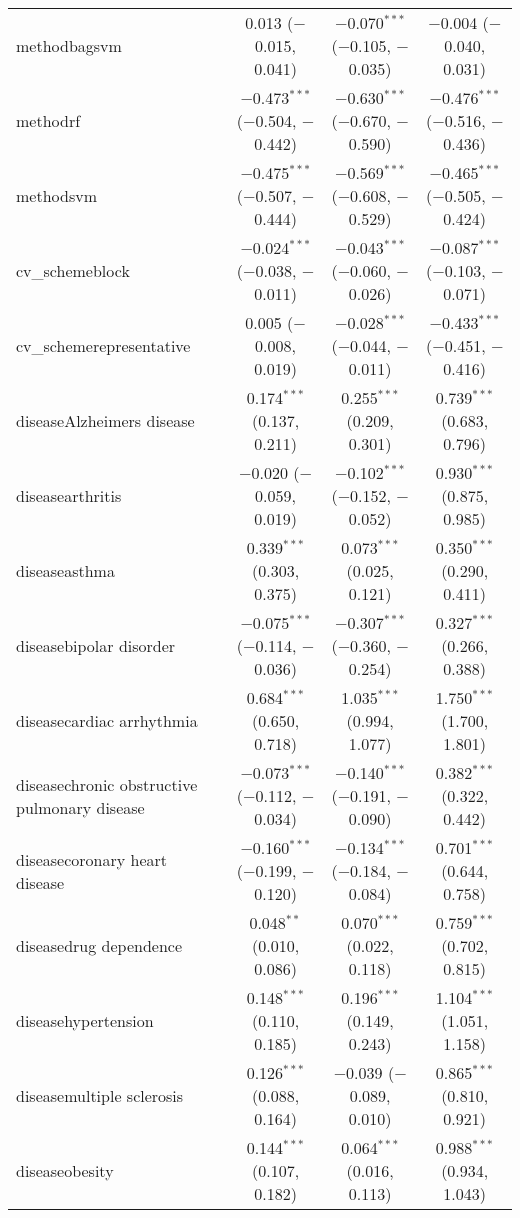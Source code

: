 \begin{table}[!htbp]
\begin{tabular}{@{\extracolsep{5pt}}lccc}
  methodbagsvm & 0.013 ($-$0.015, 0.041) & $-$0.070$^{***}$ ($-$0.105, $-$0.035) & $-$0.004 ($-$0.040, 0.031) \\ 
  methodrf & $-$0.473$^{***}$ ($-$0.504, $-$0.442) & $-$0.630$^{***}$ ($-$0.670, $-$0.590) & $-$0.476$^{***}$ ($-$0.516, $-$0.436) \\ 
  methodsvm & $-$0.475$^{***}$ ($-$0.507, $-$0.444) & $-$0.569$^{***}$ ($-$0.608, $-$0.529) & $-$0.465$^{***}$ ($-$0.505, $-$0.424) \\ 
  cv\_schemeblock & $-$0.024$^{***}$ ($-$0.038, $-$0.011) & $-$0.043$^{***}$ ($-$0.060, $-$0.026) & $-$0.087$^{***}$ ($-$0.103, $-$0.071) \\ 
  cv\_schemerepresentative & 0.005 ($-$0.008, 0.019) & $-$0.028$^{***}$ ($-$0.044, $-$0.011) & $-$0.433$^{***}$ ($-$0.451, $-$0.416) \\ 
  diseaseAlzheimers disease & 0.174$^{***}$ (0.137, 0.211) & 0.255$^{***}$ (0.209, 0.301) & 0.739$^{***}$ (0.683, 0.796) \\ 
  diseasearthritis & $-$0.020 ($-$0.059, 0.019) & $-$0.102$^{***}$ ($-$0.152, $-$0.052) & 0.930$^{***}$ (0.875, 0.985) \\ 
  diseaseasthma & 0.339$^{***}$ (0.303, 0.375) & 0.073$^{***}$ (0.025, 0.121) & 0.350$^{***}$ (0.290, 0.411) \\ 
  diseasebipolar disorder & $-$0.075$^{***}$ ($-$0.114, $-$0.036) & $-$0.307$^{***}$ ($-$0.360, $-$0.254) & 0.327$^{***}$ (0.266, 0.388) \\ 
  diseasecardiac arrhythmia & 0.684$^{***}$ (0.650, 0.718) & 1.035$^{***}$ (0.994, 1.077) & 1.750$^{***}$ (1.700, 1.801) \\ 
  diseasechronic obstructive pulmonary disease & $-$0.073$^{***}$ ($-$0.112, $-$0.034) & $-$0.140$^{***}$ ($-$0.191, $-$0.090) & 0.382$^{***}$ (0.322, 0.442) \\ 
  diseasecoronary heart disease & $-$0.160$^{***}$ ($-$0.199, $-$0.120) & $-$0.134$^{***}$ ($-$0.184, $-$0.084) & 0.701$^{***}$ (0.644, 0.758) \\ 
  diseasedrug dependence & 0.048$^{**}$ (0.010, 0.086) & 0.070$^{***}$ (0.022, 0.118) & 0.759$^{***}$ (0.702, 0.815) \\ 
  diseasehypertension & 0.148$^{***}$ (0.110, 0.185) & 0.196$^{***}$ (0.149, 0.243) & 1.104$^{***}$ (1.051, 1.158) \\ 
  diseasemultiple sclerosis & 0.126$^{***}$ (0.088, 0.164) & $-$0.039 ($-$0.089, 0.010) & 0.865$^{***}$ (0.810, 0.921) \\ 
  diseaseobesity & 0.144$^{***}$ (0.107, 0.182) & 0.064$^{***}$ (0.016, 0.113) & 0.988$^{***}$ (0.934, 1.043) \\ 

\end{tabular}
\end{table}
